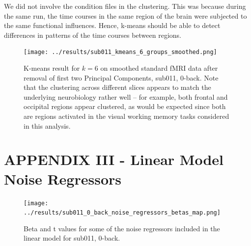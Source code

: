 \documentclass[11pt]{article}
\begin{document}
We did not involve the condition files in the clustering. This was because during
the same run, the time courses in the same region of the brain were subjected to the
same functional influences. Hence, k-means should be able to detect differences in
patterns of the time courses between regions.

\begin{figure}[H]
\centering
\texttt{[image: ../results/sub011\_kmeans\_6\_groups\_smoothed.png]}
\caption{K-means result for $k=6$ on smoothed standard fMRI data after removal of first two Principal Components, sub011, 0-back. Note that the clustering across different slices appears to match the underlying neurobiology rather well -- for example, both frontal and occipital regions appear clustered, as would be expected since both are regions activated in the visual working memory tasks considered in this analysis.}
\end{figure} 

\section{APPENDIX III - Linear Model Noise Regressors}

\begin{figure}[H]
\centering
\texttt{[image: ../results/sub011\_0\_back\_noise\_regressors\_betas\_map.png]}
\caption{Beta and t values for some of the noise regressors included in the linear model for sub011, 0-back.}
\end{figure} 
\end{document}
